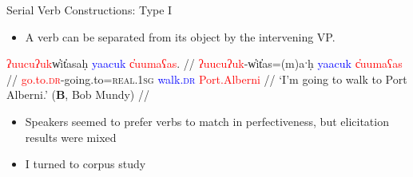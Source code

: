 \begin{frame}[fragile]{Serial Verb Constructions: Type I}

\begin{itemize}
\item A verb can be separated from its object by the intervening VP.
\end{itemize}

\ex[exno=16]
\begingl
\glpreamble \textcolor{red}{ʔuucuʔuk}w̓it̓asaḥ \textcolor{blue}{yaacuk} \textcolor{red}{c̓uumaʕas}. //
\gla \textcolor{red}{ʔuucuʔuk}-w̓it̓as=(m)aˑḥ \textcolor{blue}{yaacuk} \textcolor{red}{c̓uumaʕas} //
\glb \textcolor{red}{go.to.\textsc{dr}}-going.to=\textsc{real.1sg} \textcolor{blue}{walk.\textsc{dr}} \textcolor{red}{Port.Alberni} //
\glft `I'm going to walk to Port Alberni.' (\textbf{B}, Bob Mundy) //
\endgl \label{ex:walktoalberni}
\xe


\begin{comment}
\ex
\begingl
\glpreamble \textcolor{red}{ʔuʔiis}ʔaƛ̓in \textcolor{blue}{haʔuk} \textcolor{red}{suuḥaa}. //
\gla \textcolor{red}{ʔu-!iis}=!aƛ=!in \textcolor{blue}{haʔuk} \textcolor{red}{suuḥaa} //
\glb \textcolor{red}{\textsc{x}-eat}=\textsc{now}=\textsc{cmmd.1pl} \textcolor{blue}{eat.\textsc{dr}} \textcolor{red}{spring.salmon} //
\glft `Let's eat spring salmon!' (\textbf{B}, Bob Mundy and Marjorie Touchie) //
\endgl \label{ex:eateat2}
\xe

\ex~
\adjustbox{max width=\textwidth - 0.7in}{
\begingl
\glpreamble \textcolor{red}{hiniic}intiisʔinł \textcolor{blue}{ʔucičƛ ciquuwłi} \textcolor{red}{t̓aatn̓aʔiskqs}. //
\gla \textcolor{red}{hina-iic}=int=(y)iis=ʔinł \textcolor{blue}{ʔu-ci-čiƛ} \textcolor{blue}{ciq-uwił=ʔiˑ} \textcolor{red}{L.<t>-t̓an̓a=ʔis=uk=qaˑs}  //
\glb \textcolor{red}{\textsc{empty}-carry}=\textsc{pst}=\textsc{weak.1sg}=\textsc{habit} \textcolor{blue}{\textsc{x}-go.to-\textsc{pf}} \textcolor{blue}{pray-building} \textcolor{red}{\textsc{pl}-child=\textsc{dim}=\textsc{poss}=\textsc{defn.1sg}} //
\glft `I would always take my children to church.' (\textbf{Q}, Sophie Billy) //
\endgl \label{ex:takechildrentochurch}
}
\xe
\end{comment}

\pause

\begin{itemize}
\item Speakers seemed to prefer verbs to match in perfectiveness, but elicitation results were mixed
\item I turned to corpus study
\end{itemize}

\end{frame}

